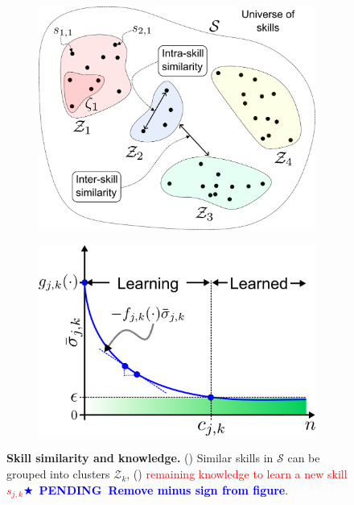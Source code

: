 \documentclass[12pt]{article}
\newcommand\myhl[1]{\textcolor{red}{#1}}
\newcommand*{\pending}[1]{\textcolor{blue}{$\bigstar$~\textbf{PENDING~#1}}}
\begin{document}
\begin{figure}[!t]
	\centering
	\hspace*{\fill}
	\begin{subfigure}[t]{0.45\textwidth}
		\subcaption{}
		\includegraphics[width= \textwidth]{skill_similarity.png} \label{fig:skill_similarity}
	\end{subfigure}
	\hfill
	\begin{subfigure}[t]{0.48\textwidth}
		\subcaption{}
		\includegraphics[width=\textwidth]{knowledge_idealization.png} \label{fig:knowledge_idealization}
	\end{subfigure}
	\hspace*{\fill}
	\caption[] {\label{fig:experimental_results} \textbf{Skill similarity and knowledge.} () Similar skills in $\mathcal{S}$ can be grouped into clusters $\mathcal{Z}_k$, () \myhl{remaining knowledge to learn a new skill $s_{j,k}$}\pending{Remove minus sign from figure}.}	
\end{figure}
\end{document}

